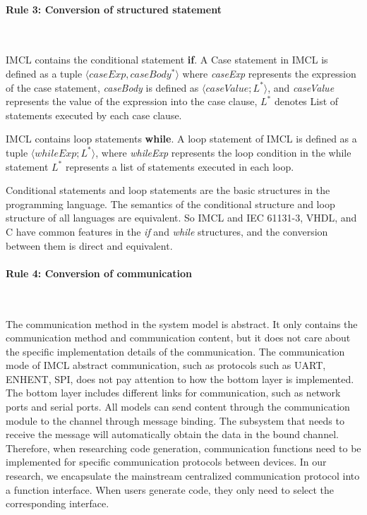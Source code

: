 \paragraph{\textbf{Rule 3: Conversion of structured statement}} \

IMCL contains the conditional statement \textbf{if}. A Case statement in IMCL is defined as a tuple $\langle caseExp, caseBody^{*} \rangle$ where \emph{caseExp} represents the expression of the case statement, \emph{caseBody} is defined as $\langle caseValue; L^{*} \rangle$, and \emph{caseValue} represents the value of the expression into the case clause, $L^{*}$ denotes List of statements executed by each case clause.

IMCL contains loop statements \textbf{while}. A loop statement of IMCL is defined as a tuple $\langle whileExp; L^* \rangle$, where \emph{whileExp} represents the loop condition in the while statement $L^*$ represents a list of statements executed in each loop.

Conditional statements and loop statements are the basic structures in the programming language. The semantics of the conditional structure and loop structure of all languages are equivalent. So IMCL and IEC 61131-3, VHDL, and C have common features in the \emph{if} and \emph{while} structures, and the conversion between them is direct and equivalent.


\paragraph{\textbf{Rule 4: Conversion of communication}} \

The communication method in the system model is abstract. It only contains the communication method and communication content, but it does not care about the specific implementation details of the communication. The communication mode of IMCL abstract communication, such as protocols such as UART, ENHENT, SPI, does not pay attention to how the bottom layer is implemented. The bottom layer includes different links for communication, such as network ports and serial ports. All models can send content through the communication module to the channel through message binding. The subsystem that needs to receive the message will automatically obtain the data in the bound channel. Therefore, when researching code generation, communication functions need to be implemented for specific communication protocols between devices. In our research, we encapsulate the mainstream centralized communication protocol into a function interface. When users generate code, they only need to select the corresponding interface.

